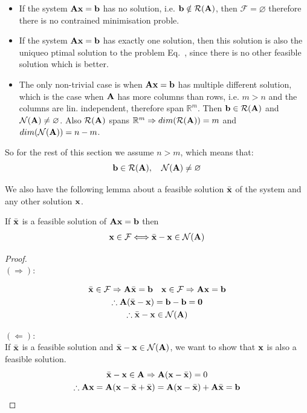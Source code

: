 \documentclass[a4paper]{article}
\numberwithin{equation}{section} %
\newcounter{solution}
\newcommand{\setR}{\mathbb{R}} %
\let\emptyset\varnothing %
\newcommand{\fancyN}{\mathcal{N}} %
\newcommand{\B}[1]{\textbf{\textup{#1}}} %
\renewcommand{\eqref}{Eq.~\originaleqref}
\renewcommand*{\eqref}[1]{Eq.~\originaleqref{#1}}
\begin{document}
\begin{itemize}
\item If the system $\B{Ax}=\B{b}$ has no solution, i.e. $\B{b} \notin \mathcal{R}(\B{A})$, then $\mathcal{F}=\emptyset$ therefore there is no contrained minimisation proble.
\item If the system $\B{Ax}=\B{b}$ has exactly one solution, then this solution is also the uniqueo ptimal solution to the problem \eqref{eq:constr_opt_problem}, since there is no other feasible solution which is better.
\item The only non-trivial case is when $\B{Ax}=\B{b}$ has multiple different solution, which is the case when $\B{A}$ has more columns than rows, i.e. $m>n$ and the columns are lin. independent, therefore span $\setR^m$. Then $\B{b} \in \mathcal{R}(\B{A})$ and $\mathcal{N}(\B{A}) \neq \emptyset$. Also $\mathcal{R}(\B{A})$ spans $\setR ^m \Rightarrow dim( \mathcal{R}(\B{A}))=m$ and $dim(\mathcal{N}(\B{A}))=n-m$. 
\end{itemize}

So for the rest of this section we assume $n>m$, which means that:
\begin{equation}
\B{b} \in \mathcal{R}(\B{A}), \quad \mathcal{N}(\B{A}) \neq \emptyset
\end{equation}

We also have the following lemma about a feasible solution $\bar{\B{x}}$ of the system and any other solution $\B{x}$.

\begin{lemma}
If $\bar{\B{x}} $ is a feasible solution of $\B{Ax}=\B{b}$ then
\[
\begin{gathered}
\B{x} \in \mathcal{F} \Longleftrightarrow 
\bar{\B{x}} - \B{x} \in \mathcal{N}(\B{A})
\end{gathered}
\]
\end{lemma}
\begin{proof}\quad \\
$(\Rightarrow)$:

\[
\begin{gathered}
\bar{\B{x}} \in \mathcal{F} \Rightarrow \B{A}\bar{\B{x}} = \B{b} \quad
\B{x} \in \mathcal{F} \Rightarrow \B{A}\B{x} = \B{b} \\
\therefore \B{A}(\bar{\B{x}} - \B{x}) = \B{b} - \B{b} = \B{0} \\
\therefore \bar{\B{x}} - \B{x} \in \fancyN(\B{A})
\end{gathered}
\]

$(\Leftarrow)$:\\
If $\bar{\B{x}}$ is a feasible solution and $ \bar{\B{x}} - \B{x} \in \mathcal{N}(\B{A})$, we want to show that $\B{x}$ is also a feasible solution.
\[
\begin{gathered}
\bar{\B{x}} - \B{x} \in \mathcal{\B{A}} \Rightarrow \B{A}(\B{x} - \bar{\B{x}}) = 0\\
\therefore \B{A}\B{x} = \B{A}(\B{x} - \bar{\B{x}}  + \bar{\B{x}} ) = 
\B{A}(\B{x} - \bar{\B{x}})+\B{A}\bar{\B{x}} = \B{b}
\end{gathered}
\]
\end{proof}
\end{document}
